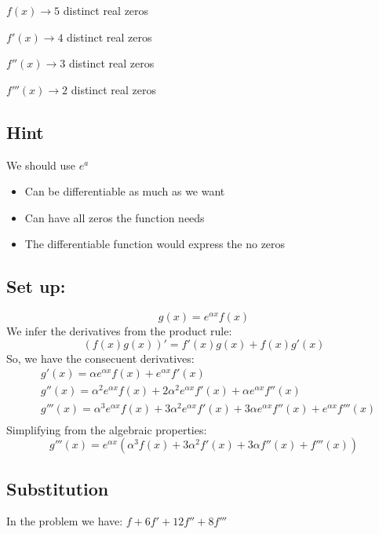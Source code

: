 \documentclass{article}
\begin{document}
    $f(x) \rightarrow 5$ distinct real zeros

    $f'(x) \rightarrow 4$ distinct real zeros

    $f''(x) \rightarrow 3$ distinct real zeros

    $f'''(x) \rightarrow 2$ distinct real zeros

    \subsection{Hint}
    We should use $e^a$

    \begin{itemize}
        \item Can be differentiable as much as we want
        \item Can have all zeros the function needs
        \item The differentiable function would express the no zeros
    \end{itemize}

    \subsection{Set up:}
    $$g(x) = e^{\alpha x} f(x)$$
    We infer the derivatives from the product rule:
    $$(f(x) g(x))' = f'(x) g(x) + f(x) g'(x)$$
    So, we have the consecuent derivatives:
    \begin{equation}
        \begin{split}
        &g'(x) = \alpha e^{\alpha x} f(x) + e^{\alpha x} f'(x)\\
        &g''(x) = \alpha ^2 e^{\alpha x} f(x) + 2\alpha ^2 e^{\alpha x} f'(x) + \alpha e^{\alpha x} f''(x)\\
        &g'''(x) = \alpha ^3 e^{\alpha x} f(x) + 3\alpha ^2 e^{\alpha x} f'(x) + 3\alpha e^{\alpha x} f''(x) + e^{\alpha x} f'''(x)\\
        \end{split}
    \end{equation}
    Simplifying from the algebraic properties:
    $$g'''(x) = e^{\alpha x} (\alpha ^3  f(x) + 3\alpha ^2f'(x) + 3\alpha f''(x) +  f'''(x))$$

    \subsection{Substitution}
    In the problem we have: $f + 6f' + 12f'' + 8f'''$
\end{document}
